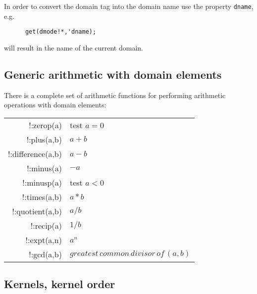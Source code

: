 In order to convert the domain tag into the domain name
use the property {\tt dname}, e.g.
\begin{verbatim}
      get(dmode!*,'dname);
\end{verbatim}
will result in the name of the current domain.

\subsection{Generic arithmetic with domain elements}

There is a complete set of arithmetic functions for performing
arithmetic operations with domain elements:

\begin{center}
\begin{tabular}{|r|l|} \hline
    !:zerop(a)        & test $a=0$ \\
    !:plus(a,b)       & $a+b$ \\
    !:difference(a,b) & $a-b$ \\
    !:minus(a)        & $-a$  \\
    !:minusp(a)       & test $a<0$ \\
    !:times(a,b)      & $a*b$ \\
    !:quotient(a,b)   & $a/b$ \\
    !:recip(a)        & $1/b$ \\
    !:expt(a,n)       & $a^n$ \\
    !:gcd(a,b)  & $greatest\, common\, divisor\, of\,(a,b)$ \\
\hline
\end{tabular}
\end{center}

\subsection{Kernels, kernel order}

